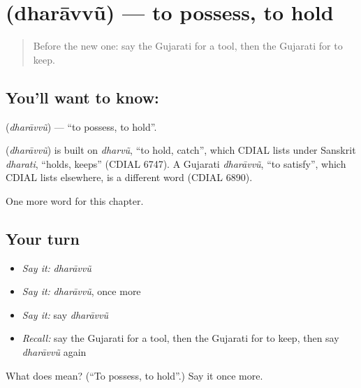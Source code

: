 \section[\texorpdfstring{\gu{ધરાવવું} (dharāvvũ)}{ધરાવવું (dharāvvũ)}]{ (dharāvvũ) — to possess, to hold}

\label{lesson:GU-C105-dharavvu}



\begin{quote}
Before the new one: say the Gujarati for a tool, then the Gujarati for to keep.
\end{quote}

\subsection*{You'll want to know: }
\textbf{} (\emph{dharāvvũ}) — \textquotedblleft{}to possess, to hold\textquotedblright{}.

\begin{cousinweb}
\textbf{} (\emph{dharāvvũ}) is built on \emph{dharvũ}, \textquotedblleft{}to hold, catch\textquotedblright{}, which CDIAL lists under Sanskrit \emph{dharati}, \textquotedblleft{}holds, keeps\textquotedblright{} (CDIAL 6747). A Gujarati \emph{dharāvvũ}, \textquotedblleft{}to satisfy\textquotedblright{}, which CDIAL lists elsewhere, is a different word (CDIAL 6890).
\end{cousinweb}

\begin{grammarlens}[title={What you've built}]
One more word for this chapter.
\end{grammarlens}

\subsection*{Your turn}
\begin{itemize}
\raggedright
  \item \emph{Say it:} \emph{dharāvvũ}
  \item \emph{Say it:} \emph{dharāvvũ}, once more
  \item \emph{Say it:} say \emph{dharāvvũ}
  \item \emph{Recall:} say the Gujarati for a tool, then the Gujarati for to keep, then say \emph{dharāvvũ} again
\end{itemize}

\begin{tcolorbox}[breakable,colback=teal!4,colframe=teal!35!black,title={Before you move on}]
What does  mean? (\textquotedblleft{}To possess, to hold\textquotedblright{}.) Say it once more.
\end{tcolorbox}
